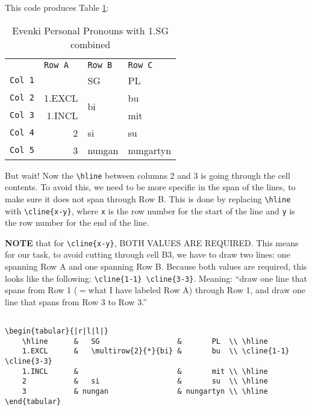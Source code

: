 \documentclass[11pt]{article}
\newcommand{\strt}{\noindent{$\bullet$} }
\begin{document}
\strt This code produces Table \ref{Evenki 2}:

\begin{table}[H]
    \centering
    \begin{tabular}{l|r|l|l|}
\multicolumn{1}{l}{}& \multicolumn{1}{l}{\texttt{Row A}} & \multicolumn{1}{l}{\texttt{Row B}} & \multicolumn{1}{l}{\texttt{Row C}}\\
 \cline{2-4}  \texttt{Col 1} &   & SG & PL  \\\cline{2-4}
    \texttt{Col 2} & 1.EXCL & \multirow{2}{*}{bi} & bu \\\cline{2-4}
    \texttt{Col 3} & 1.INCL & & mit\\\cline{2-4}
    \texttt{Col 4} & 2 & si & su \\\cline{2-4}
    \texttt{Col 5} & 3 & nungan & nungartyn\\\cline{2-4}
    \end{tabular}
    \caption{Evenki Personal Pronouns with 1.SG combined }
    \label{Evenki 2}
\end{table}

\strt But wait!  Now the \texttt{\textbackslash hline} between columns 2 and 3 is going through the cell contents.  To avoid this, we need to be more specific in the span of the lines, to make sure it does not span through Row B.  This is done by replacing \texttt{\textbackslash hline} with \texttt{\textbackslash cline\{x-y\}}, where \texttt{x} is the row number for the start of the line and \texttt{y} is the row number for the end of the line.

\strt \textbf{NOTE} that for \texttt{\textbackslash cline\{x-y\}}, BOTH VALUES ARE REQUIRED.  This means for our task, to avoid cutting through cell B3, we have to draw two lines: one spanning Row A and one spanning Row B.  Because both values are required, this looks like the following:  \texttt{\textbackslash cline\{1-1\} \textbackslash cline\{3-3\}}.  Meaning: ``draw one line that spans from Row 1 ($=$what I have labeled Row A) through Row 1,  and draw one line that spans from Row 3 to Row 3.''


\begin{lstlisting}[breaklines]

\begin{tabular}{|r|l|l|}
    \hline      &   SG                  &       PL  \\ \hline
    1.EXCL      &   \multirow{2}{*}{bi} &       bu  \\ \cline{1-1} \cline{3-3}
    1.INCL      &                       &       mit \\ \hline
    2           &   si                  &       su  \\ \hline 
    3           & nungan                & nungartyn \\ \hline
\end{tabular}

\end{lstlisting}
\end{document}
